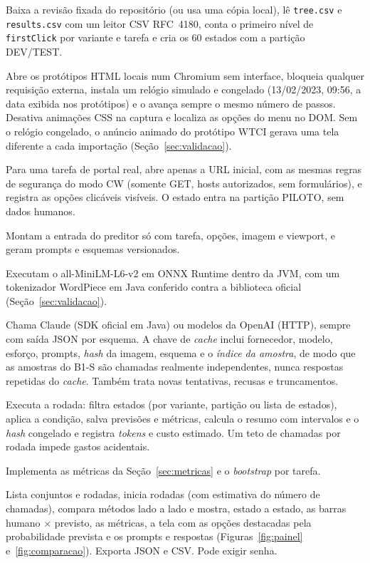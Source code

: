 \documentclass[12pt]{article}
\newcommand{\code}[1]{\texttt{#1}}
\begin{document}
\begin{description}[leftmargin=0.4cm,style=nextline,itemsep=1pt]
\item[KuricImporter.] Baixa a revisão fixada do repositório (ou usa uma cópia local), lê \code{tree.csv} e \code{results.csv} com um leitor CSV RFC~4180, conta o primeiro nível de \code{firstClick} por variante e tarefa e cria os 60 estados com a partição DEV/TEST.
\item[PrototypeRenderer.] Abre os protótipos HTML locais num Chromium sem interface, bloqueia qualquer requisição externa, instala um relógio simulado e congelado (13/02/2023, 09:56, a data exibida nos protótipos) e o avança sempre o mesmo número de passos. Desativa animações CSS na captura e localiza as opções do menu no DOM. Sem o relógio congelado, o anúncio animado do protótipo WTCI gerava uma tela diferente a cada importação (Seção~\ref{sec:validacao}).
\item[Captura independente.] Para uma tarefa de portal real, abre apenas a URL inicial, com as mesmas regras de segurança do modo CW (somente GET, hosts autorizados, sem formulários), e registra as opções clicáveis visíveis. O estado entra na partição PILOTO, sem dados humanos.
\item[NavInput e NavPrompts.] Montam a entrada do preditor só com tarefa, opções, imagem e viewport, e geram prompts e esquemas versionados.
\item[B0 (MiniLmEmbedder e WordPieceTokenizer).] Executam o all-MiniLM-L6-v2 em ONNX Runtime dentro da JVM, com um tokenizador WordPiece em Java conferido contra a biblioteca oficial (Seção~\ref{sec:validacao}).
\item[NavLlmClient.] Chama Claude (SDK oficial em Java) ou modelos da OpenAI (HTTP), sempre com saída JSON por esquema. A chave de \textit{cache} inclui fornecedor, modelo, esforço, prompts, \textit{hash} da imagem, esquema e o \emph{índice da amostra}, de modo que as amostras do B1-S são chamadas realmente independentes, nunca respostas repetidas do \textit{cache}. Também trata novas tentativas, recusas e truncamentos.
\item[NavWorker.] Executa a rodada: filtra estados (por variante, partição ou lista de estados), aplica a condição, salva previsões e métricas, calcula o resumo com intervalos e o \textit{hash} congelado e registra \textit{tokens} e custo estimado. Um teto de chamadas por rodada impede gastos acidentais.
\item[NavMetrics.] Implementa as métricas da Seção~\ref{sec:metricas} e o \textit{bootstrap} por tarefa.
\item[Painel /nav.] Lista conjuntos e rodadas, inicia rodadas (com estimativa do número de chamadas), compara métodos lado a lado e mostra, estado a estado, as barras humano $\times$ previsto, as métricas, a tela com as opções destacadas pela probabilidade prevista e os prompts e respostas (Figuras~\ref{fig:painel} e~\ref{fig:comparacao}). Exporta JSON e CSV. Pode exigir senha.
\end{description}
\end{document}
